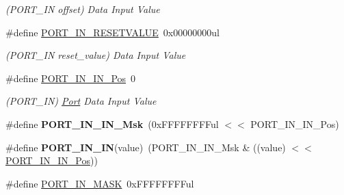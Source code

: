 \begin{DoxyCompactItemize}
\begin{DoxyCompactList}\small\item\em (P\+O\+R\+T\+\_\+\+I\+N offset) Data Input Value \end{DoxyCompactList}\item 
\hypertarget{group___s_a_m_l21___p_o_r_t_ga439d1273dd238888045148efebac2333}{}\#define \hyperlink{group___s_a_m_l21___p_o_r_t_ga439d1273dd238888045148efebac2333}{P\+O\+R\+T\+\_\+\+I\+N\+\_\+\+R\+E\+S\+E\+T\+V\+A\+L\+U\+E}~0x00000000ul\label{group___s_a_m_l21___p_o_r_t_ga439d1273dd238888045148efebac2333}

\begin{DoxyCompactList}\small\item\em (P\+O\+R\+T\+\_\+\+I\+N reset\+\_\+value) Data Input Value \end{DoxyCompactList}\item 
\hypertarget{group___s_a_m_l21___p_o_r_t_ga39fa578b833d4c48b8090804a97c918b}{}\#define \hyperlink{group___s_a_m_l21___p_o_r_t_ga39fa578b833d4c48b8090804a97c918b}{P\+O\+R\+T\+\_\+\+I\+N\+\_\+\+I\+N\+\_\+\+Pos}~0\label{group___s_a_m_l21___p_o_r_t_ga39fa578b833d4c48b8090804a97c918b}

\begin{DoxyCompactList}\small\item\em (P\+O\+R\+T\+\_\+\+I\+N) \hyperlink{struct_port}{Port} Data Input Value \end{DoxyCompactList}\item 
\hypertarget{group___s_a_m_l21___p_o_r_t_gafc8e8de4e1098dd2f63a5fb99e7a915f}{}\#define {\bfseries P\+O\+R\+T\+\_\+\+I\+N\+\_\+\+I\+N\+\_\+\+Msk}~(0x\+F\+F\+F\+F\+F\+F\+F\+Ful $<$$<$ P\+O\+R\+T\+\_\+\+I\+N\+\_\+\+I\+N\+\_\+\+Pos)\label{group___s_a_m_l21___p_o_r_t_gafc8e8de4e1098dd2f63a5fb99e7a915f}

\item 
\hypertarget{group___s_a_m_l21___p_o_r_t_gaf81b4172c78721d9834973dddc4841cf}{}\#define {\bfseries P\+O\+R\+T\+\_\+\+I\+N\+\_\+\+I\+N}(value)~(P\+O\+R\+T\+\_\+\+I\+N\+\_\+\+I\+N\+\_\+\+Msk \& ((value) $<$$<$ \hyperlink{group___s_a_m_l21___p_o_r_t_ga39fa578b833d4c48b8090804a97c918b}{P\+O\+R\+T\+\_\+\+I\+N\+\_\+\+I\+N\+\_\+\+Pos}))\label{group___s_a_m_l21___p_o_r_t_gaf81b4172c78721d9834973dddc4841cf}

\item 
\hypertarget{group___s_a_m_l21___p_o_r_t_gac632cdcc705e953c0b1040681bb7056a}{}\#define \hyperlink{group___s_a_m_l21___p_o_r_t_gac632cdcc705e953c0b1040681bb7056a}{P\+O\+R\+T\+\_\+\+I\+N\+\_\+\+M\+A\+S\+K}~0x\+F\+F\+F\+F\+F\+F\+F\+Ful\label{group___s_a_m_l21___p_o_r_t_gac632cdcc705e953c0b1040681bb7056a}


\end{DoxyCompactItemize}
